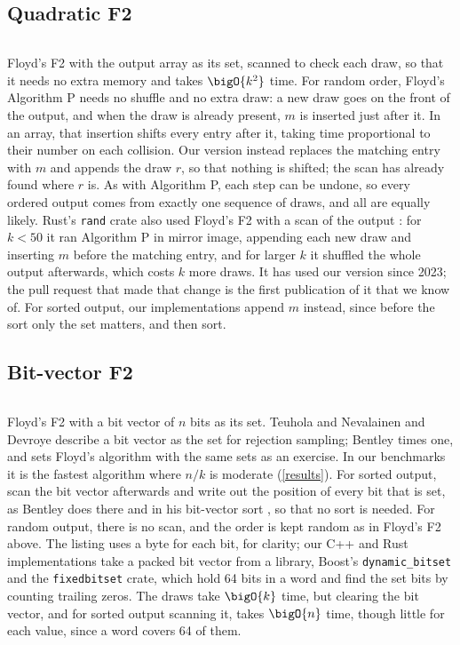 \documentclass[letterpaper,11pt]{article}
\begin{document}
\subsection{Quadratic F2}\label{quadraticf2}
\inputminted{Python}{code/quadraticf2.py}
Floyd's F2 with the output array as its set, scanned to check each
draw, so that it needs no extra memory and takes \(\bigO{k^2}\) time.
For random order, Floyd's Algorithm P \cite{floydf2} needs no shuffle
and no extra draw: a new draw goes on the front of the output, and
when the draw is already present, \(m\) is inserted just after it. In
an array, that insertion shifts every entry after it, taking time
proportional to their number on each collision. Our version instead
replaces the matching entry with \(m\) and appends the draw \(r\), so
that nothing is shifted; the scan has already found where \(r\) is. As
with Algorithm P, each step can be undone, so every ordered output
comes from exactly one sequence of draws, and all are equally likely.
Rust's \texttt{rand} crate also used
Floyd's F2 with a scan of the output \cite{rust-random}: for
\(k < 50\) it ran Algorithm P in mirror image, appending each new draw
and inserting \(m\) before the matching entry, and for larger \(k\) it
shuffled the whole output afterwards, which costs \(k\) more draws. It has used our version
since 2023; the pull request that made that change \cite{randpr} is
the first publication of it that we know of. For sorted output,
our implementations append \(m\) instead, since before the sort only
the set matters, and then sort.

\subsection{Bit-vector F2}
\inputminted{Python}{code/bitvectorf2.py}
Floyd's F2 with a bit vector of \(n\) bits as its set. Teuhola and
Nevalainen \cite{teuhola} and Devroye \cite[Chapter XII \S 2]{devroye}
describe a bit vector as the set for rejection sampling; Bentley
\cite[Column 13]{pearls} times one, and sets Floyd's algorithm with
the same sets as an exercise. In our benchmarks it is the fastest
algorithm where \(n/k\) is moderate (\autoref{results}). For sorted
output, scan the bit vector afterwards and write out the position of
every bit that is set, as Bentley does there and in his bit-vector
sort \cite[Column 1]{pearls}, so that no sort is needed. For random output, there is no scan, and the order is kept
random as in Floyd's F2 above. The listing uses a byte for each bit,
for clarity; our C++ and Rust implementations take a packed bit vector
from a library, Boost's \texttt{dynamic_bitset} and the
\texttt{fixedbitset} crate, which hold 64 bits in a word and
find the set bits by counting trailing zeros. The draws
take \(\bigO{k}\) time, but clearing the bit vector, and for sorted
output scanning it, takes \(\bigO{n}\) time, though little for each
value, since a word covers 64 of them.
\end{document}
